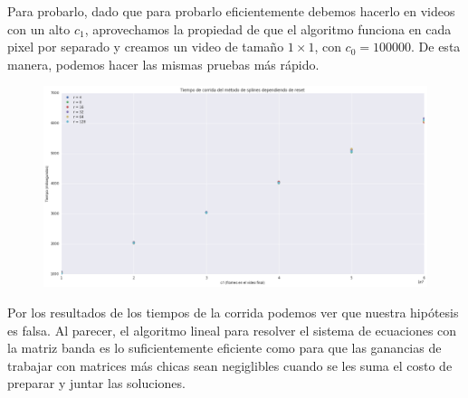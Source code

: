 Para probarlo, dado que para probarlo eficientemente debemos hacerlo en videos
con un alto $c_1$, aprovechamos la propiedad de que el algoritmo funciona en
cada pixel por separado y creamos un video de tama\~no $1 \times 1$, con $c_0 =
100000$. De esta manera, podemos hacer las mismas pruebas m\'as r\'apido.

\begin{figure}[H]
\centering
\includegraphics[width=.95\textwidth]{graficos/tiempo_reset.png}
\end{figure}

Por los resultados de los tiempos de la corrida podemos ver que nuestra
hip\'otesis es falsa. Al parecer, el algoritmo lineal para resolver el sistema
de ecuaciones con la matriz banda es lo suficientemente eficiente como para que
las ganancias de trabajar con matrices m\'as chicas sean negiglibles cuando se
les suma el costo de preparar y juntar las soluciones.
